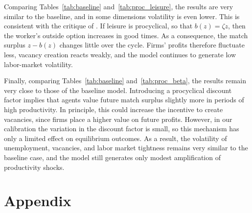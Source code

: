 \documentclass[12pt]{article}
\begin{document}
Comparing Tables~\ref{tab:baseline} and~\ref{tab:proc_leisure}, the results are very similar to the baseline, and in some dimensions volatility is even lower. This is consistent with the critique of \citet{chodorowreich2016}. If leisure is procyclical, so that $b(z)=\zeta z$, then the worker's outside option increases in good times. As a consequence, the match surplus $z-b(z)$ changes little over the cycle. Firms' profits therefore fluctuate less, vacancy creation reacts weakly, and the model continues to generate low labor-market volatility.

Finally, comparing Tables~\ref{tab:baseline} and~\ref{tab:proc_beta}, the results remain very close to those of the baseline model. Introducing a procyclical discount factor implies that agents value future match surplus slightly more in periods of high productivity. In principle, this could increase the incentive to create vacancies, since firms place a higher value on future profits. However, in our calibration the variation in the discount factor is small, so this mechanism has only a limited effect on equilibrium outcomes. As a result, the volatility of unemployment, vacancies, and labor market tightness remains very similar to the baseline case, and the model still generates only modest amplification of productivity shocks.

\section*{Appendix}









 
\end{document}
